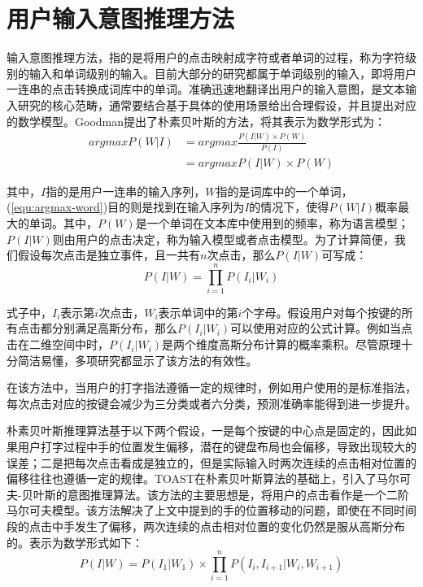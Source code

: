 \section{用户输入意图推理方法}
输入意图推理方法，指的是将用户的点击映射成字符或者单词的过程，称为字符级别的输入和单词级别的输入。目前大部分的研究都属于单词级别的输入，即将用户一连串的点击转换成词库中的单词。准确迅速地翻译出用户的输入意图，是文本输入研究的核心范畴，通常要结合基于具体的使用场景给出合理假设，并且提出对应的数学模型。Goodman\cite{language2002goodman}提出了朴素贝叶斯的方法，将其表示为数学形式为：
\begin{equation}
    \label{equ:argmax-word}
    \begin{aligned}
    argmax P(W|I) &= argmax \frac{P(I|W) \times P(W)}{P(I)} \\
                  &= argmax P(I|W) \times P(W)
    \end{aligned}
\end{equation}

其中，$I$指的是用户一连串的输入序列，$W$指的是词库中的一个单词，(\ref{equ:argmax-word})目的则是找到在输入序列为$I$的情况下，使得$P(W|I)$概率最大的单词。其中，$P(W)$是一个单词在文本库中使用到的频率，称为语言模型；$P(I|W)$则由用户的点击决定，称为输入模型或者点击模型。为了计算简便，我们假设每次点击是独立事件，且一共有$n$次点击，那么$P(I|W)$可写成：
\begin{equation}
    P(I|W) = \prod_{i=1}^{n}P(I_i|W_i)
\end{equation}

式子中，$I_i$表示第$i$次点击，$W_i$表示单词中的第$i$个字母。假设用户对每个按键的所有点击都分别满足高斯分布，那么$P(I_i|W_i)$可以使用对应的公式计算。例如当点击在二维空间中时，$P(I_i|W_i)$是两个维度高斯分布计算的概率乘积。尽管原理十分简洁易懂，多项研究\cite{2017blindtype}\cite{2015atk}\cite{2018forceboard}都显示了该方法的有效性。

在该方法中，当用户的打字指法遵循一定的规律时，例如用户使用的是标准指法\cite{2015atk}，每次点击对应的按键会减少为三分类或者六分类，预测准确率能得到进一步提升。

朴素贝叶斯推理算法基于以下两个假设，一是每个按键的中心点是固定的，因此如果用户打字过程中手的位置发生偏移，潜在的键盘布局也会偏移，导致出现较大的误差；二是把每次点击看成是独立的，但是实际输入时两次连续的点击相对位置的偏移往往也遵循一定的规律\cite{2018shitoast}。TOAST\cite{2018shitoast}在朴素贝叶斯算法的基础上，引入了马尔可夫-贝叶斯的意图推理算法。该方法的主要思想是，将用户的点击看作是一个二阶马尔可夫模型。该方法解决了上文中提到的手的位置移动的问题，即使在不同时间段的点击中手发生了偏移，两次连续的点击相对位置的变化仍然是服从高斯分布的。表示为数学形式如下：
\begin{equation}
    \label{equ:markov-bayesian}
    P(I|W) = P(I_1|W_1) \times \prod_{i=1}^{n}P(I_i, I_{i+1}|W_i, W_{i+1})
\end{equation}

